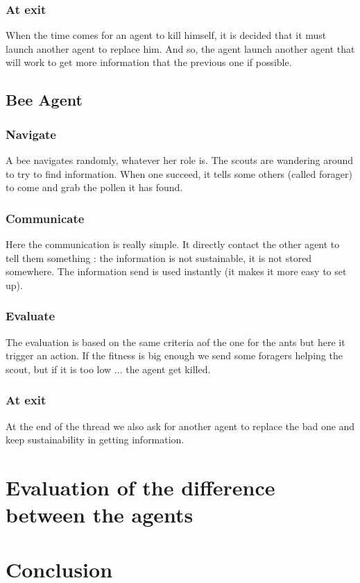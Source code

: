 \documentclass{article}
\begin{document}
		\subsubsection{At exit}
			When the time comes for an agent to kill himself, it is decided that it must launch another agent to replace him.
			And so, the agent launch another agent that will work to get more information that the previous one if possible.
	\subsection{Bee Agent}
		\subsubsection{Navigate}
			A bee navigates randomly, whatever her role is.
			The scouts are wandering around to try to find information.
			When one succeed, it tells some others (called forager) to come and grab the pollen it has found.
		\subsubsection{Communicate}
			Here the communication is really simple.
			It directly contact the other agent to tell them something : the information is not sustainable, it is not stored somewhere.
			The information send is used instantly (it makes it more easy to set up).
		\subsubsection{Evaluate}
			The evaluation is based on the same criteria aof the one for the ants but here it trigger an action.
			If the fitness is big enough we send some foragers helping the scout, but if it is too low ... the agent get killed.
		\subsubsection{At exit}
			At the end of the thread we also ask for another agent to replace the bad one and keep sustainability in getting information.
			
\section{Evaluation of the difference between the agents}
	

\newpage
\section{Conclusion}
	
\end{document}
